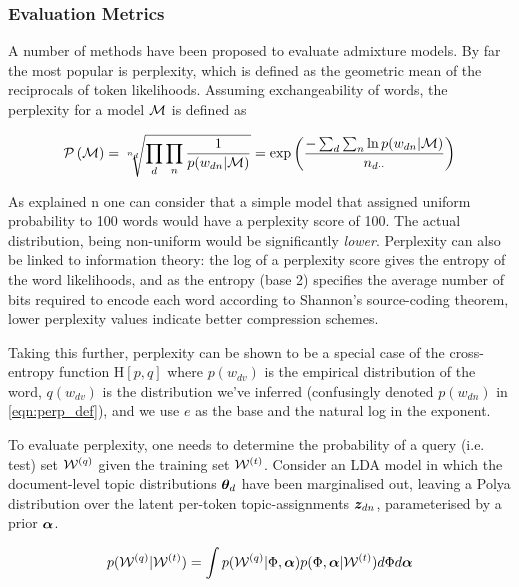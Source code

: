 


\subsubsection{Evaluation Metrics}
\label{sec:eval}

A number of methods have been proposed to evaluate admixture models. By far the most popular is perplexity, which is defined as the geometric mean of the reciprocals of token likelihoods. Assuming exchangeability of words, the perplexity for a model $\mathcal{M}$ is defined as

\begin{align}
\mathcal{P} \left( { \mathcal{M} } \right) = \sqrt[n_{d}]{\prod_d \prod_n \frac{1}{p(w_{dn}|\mathcal{M})}} = \exp \left( \frac{-\sum_d \sum_n \ln p(w_{dn}|\mathcal{M})}{n_{d\cdot\cdot}} \right) \label{eqn:perp_def}
\end{align}

As explained n \cite{Goodman2001} one can consider that a simple model that assigned uniform probability to 100 words would have a perplexity score of 100. The actual distribution, being non-uniform would be significantly \emph{lower}. Perplexity can also be linked to information theory: the log of a perplexity score gives the entropy of the word likelihoods, and as the entropy (base 2) specifies the average number of bits required to encode each word according to Shannon's source-coding theorem, lower perplexity values indicate better compression schemes.

Taking this further, perplexity can be shown to be a special case of the cross-entropy function $\text{H}[p,q]$ where $p(w_{dv})$ is the empirical distribution of the word, $q(w_{dv})$ is the distribution we've inferred (confusingly denoted $p(w_{dn})$ in \eqref{eqn:perp_def}), and we use $e$ as the base and the natural log in the exponent. 

To evaluate perplexity, one needs to determine the probability of a query (i.e. test) set $\mathcal{W}^{(q)}$ given the training set $\mathcal{W}^{(t)}$. Consider an LDA model in which the document-level topic distributions ${ \bm \theta_d }$ have been marginalised out, leaving a Polya distribution over the latent per-token topic-assignments ${ \bm z_{dn} }$, parameterised by a prior $\bm \alpha$.

\begin{align}
p(\mathcal{W}^{(q)}|\mathcal{W}^{(t)}) = \int p(\mathcal{W}^{(q)}|\Phi, \bm \alpha)p(\Phi,\bm \alpha | \mathcal{W}^{(t)}) d\Phi d\bm \alpha
\end{align}

